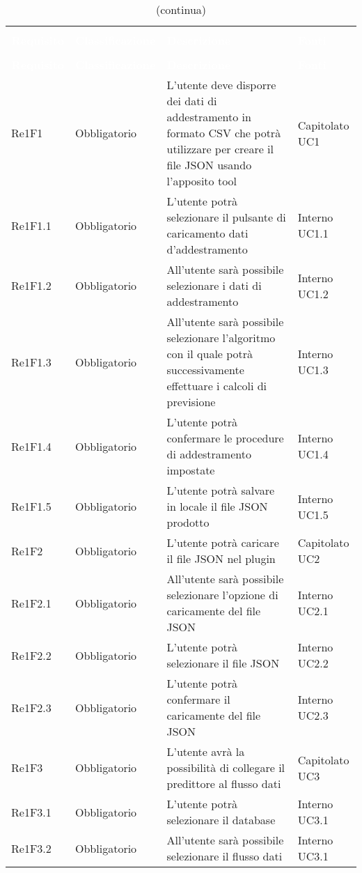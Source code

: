 \begin{longtable}{C{3cm} C{3cm} L{5.5cm} C{3cm}}
\caption{Tabella dei requisiti funzionali} \\
\textcolor{white}{\textbf{Requisito}} &
\textcolor{white}{\textbf{Classificazione}} &
\textcolor{white}{\textbf{Descrizione}} &
\textcolor{white}{\textbf{Fonti}}  \\
		\endfirsthead
		\caption[]{(continua)} \\
\textcolor{white}{\textbf{Requisito}} &
\textcolor{white}{\textbf{Classificazione}} &
\textcolor{white}{\textbf{Descrizione}} &
\textcolor{white}{\textbf{Fonti}}  \\
		\endhead
Re1F1 & Obbligatorio & L’utente deve disporre dei dati di addestramento in formato CSV che potrà utilizzare  per creare il file JSON usando l’apposito tool & Capitolato UC1\\
Re1F1.1 & Obbligatorio & L’utente potrà selezionare il pulsante di caricamento dati d'addestramento &  Interno UC1.1\\
Re1F1.2 & Obbligatorio & All’utente sarà possibile selezionare i dati di addestramento &  Interno UC1.2\\
Re1F1.3 & Obbligatorio & All’utente sarà possibile selezionare l’algoritmo con il quale potrà successivamente effettuare i calcoli di previsione &  Interno UC1.3\\
Re1F1.4 & Obbligatorio & L’utente potrà confermare le procedure di addestramento impostate &  Interno UC1.4\\
Re1F1.5 & Obbligatorio & L’utente potrà salvare in locale il file JSON prodotto & Interno UC1.5\\
Re1F2 & Obbligatorio & L’utente potrà caricare il file JSON nel plugin & Capitolato UC2\\
Re1F2.1 & Obbligatorio & All’utente sarà possibile selezionare l’opzione di caricamente del file JSON &  Interno UC2.1\\
Re1F2.2 & Obbligatorio & L’utente potrà selezionare il file JSON &  Interno UC2.2\\
Re1F2.3 & Obbligatorio & L’utente potrà confermare il caricamente del file JSON &  Interno UC2.3\\
Re1F3 & Obbligatorio & L’utente avrà la possibilità di collegare il predittore al flusso dati &  Capitolato UC3\\
Re1F3.1 & Obbligatorio & L’utente potrà selezionare il database &  Interno UC3.1\\
Re1F3.2 & Obbligatorio & All’utente sarà possibile selezionare il flusso dati &  Interno UC3.1\\

\end{longtable}
